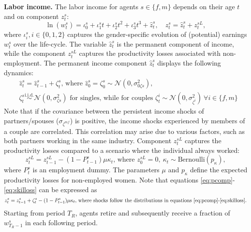 \documentclass[12pt]{article}
\numberwithin{table}{section}
\begin{document}
\textbf{Labor income.} The labor income for agents $s\in\{f,m\}$ depends on their age $t$ and on component $z^s_t$:
\begin{equation}\label{eq:ldeterm}
	\ln(w^s_t)=\iota^{s}_0+\iota^{s}_1 t+\iota^{s}_2 t^2+\iota^{s}_3 t^3+\hat{z}^s_t,\quad z^s_t = \hat{z}^s_t+z^{sL}_t, 
\end{equation}
where $\iota^{s}_i, i\in\{0,1,2\}$ captures the gender-specific evolution of (potential) earnings $w^s_t$ over the life-cycle. The variable $\hat{z}^s_t$ is the permanent component of income, while the component $z^{sL}_t$ captures the productivity losses associated with non-employment. The permanent income component  $\hat{z}^s_t$ displays the following dynamics:
\begin{align}\label{eq:pcomp}
	&\hat{z}^s_t=\hat{z}^s_{t-1}+ \zeta^s_t\text{, where }\hat{z}^s_{0}=\zeta^s_{0}\sim\mathcal{N}(0,\sigma_{0 \zeta s}^{2}),\\
	&\nonumber\zeta^s_{t}\overset{\text{i.i.d.}}{\sim}\mathcal{N}(0,\sigma_{\zeta s}^{2})\text{ for singles, while for couples }
		\zeta_t^i  \sim \mathcal{N}(0,  \sigma_{\zeta^i}^2) \ \forall i \in\{f,m\}
\end{align}
Note that if the covariance between the persistent income shocks of partners/spouses ($\sigma_{\zeta^{mf}}$) is positive, the income shocks experienced by members of a couple are correlated. This correlation may arise due to various factors, such as both partners working in the same industry. Component $z^{sL}_t$ captures the productivity losses compared to a scenario where the individual always worked:
\begin{equation}\label{eq:skilloss}
	z^{sL}_t=z^{sL}_{t-1}-(1-P_{t-1}^s) \mu \kappa_t\text{, where }z^{sL}_{0}=0, \ \kappa_t\sim \text{Bernoulli}(p_\kappa),
\end{equation}
where $P^s_t$ is an employment dummy. The parameters $\mu$ and $p_\kappa$ define the expected productivity losses for non-employed women. Note that equations \eqref{eq:pcomp}-\eqref{eq:skilloss} can be expressed as
\begin{equation}\label{eq:z}
	z^s_t=z^s_{t-1}+ \zeta^s_t -(1-P_{t-1}^s) \mu \kappa_t\text{, where shocks follow the distributions in equations \eqref{eq:pcomp}-\eqref{eq:skilloss}.}
\end{equation}
Starting from period $T_R$, agents retire and subsequently receive a fraction of $w^s_{T_R-1}$ in each following period.

\end{document}
